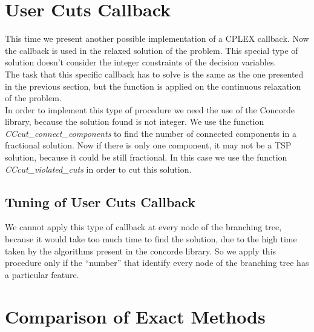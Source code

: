 \section{User Cuts Callback}
This time we present another possible implementation of a CPLEX callback. Now the callback is used in the relaxed solution of the problem. This special type of solution doesn’t consider the integer constraints of the decision variables. \\
The task that this specific callback has to solve is the same as the one presented in the previous section, but the function  is applied on the continuous relaxation of the problem.\\
In order to implement this type of procedure we need the use of the Concorde library, because the solution found is not integer.
We use the function \textit{CCcut\_connect\_components} to find the number of connected components in a fractional solution. Now if there is only one component, it may not be a TSP solution, because it could be still fractional. In this case we use the function \textit{CCcut\_violated\_cuts} in order to cut this solution.\\


\subsection{Tuning of User Cuts Callback}
We cannot apply this type of callback at every node of the branching tree, because it would take too much time to find the solution, due to the high time taken by the algorithms present in the concorde library. So we apply this procedure only if the “number” that identify every node of the branching tree has a particular feature.

\section{Comparison of Exact Methods}